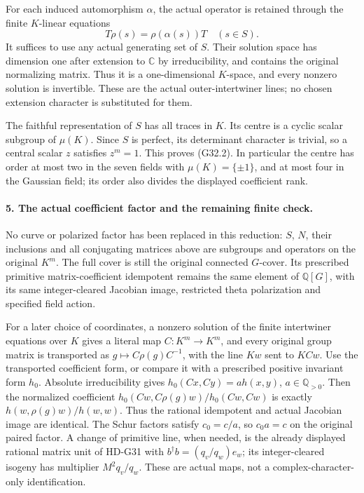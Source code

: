 For each induced automorphism \(\alpha\), the actual operator
is retained through the finite \(K\)-linear equations
\[
                 T\rho(s)=\rho(\alpha(s))T\quad(s\in S).
 \tag{G32.13}
\]
It suffices to use any actual generating set of \(S\). Their
solution space has dimension one after extension to \(\mathbb C\)
by irreducibility, and contains the original normalizing matrix.
Thus it is a one-dimensional \(K\)-space, and every nonzero
solution is invertible. These are the actual outer-intertwiner
lines; no chosen extension character is substituted for them.

The faithful representation of \(S\) has all traces in \(K\).
Its centre is a cyclic scalar subgroup of \(\mu(K)\). Since
\(S\) is perfect, its determinant character is trivial, so a
central scalar \(z\) satisfies \(z^m=1\). This proves (G32.2).
In particular the centre has order at most two in the seven
fields with \(\mu(K)=\{\pm1\}\), and at most four in the Gaussian
field; its order also divides the displayed coefficient rank.

\paragraph{5. The actual coefficient factor and the remaining finite check.}
No curve or polarized factor has been replaced in this reduction:
\(S\), \(N\), their inclusions and all conjugating matrices above
are subgroups and operators on the original \(K^m\). The full
cover is still the original connected \(G\)-cover. Its prescribed
primitive matrix-coefficient idempotent remains the same element
of \(\mathbb Q[G]\), with its same integer-cleared Jacobian image,
restricted theta polarization and specified field action.

For a later choice of coordinates, a nonzero solution of the
finite intertwiner equations over \(K\) gives a literal map
\(C:K^m\to K^m\), and every original group matrix is transported
as \(g\mapsto C\rho(g)C^{-1}\), with the line \(Kw\) sent to
\(KCw\). Use the transported coefficient form, or compare it
with a prescribed positive invariant form \(h_0\). Absolute
irreducibility gives
\(h_0(Cx,Cy)=a h(x,y)\), \(a\in\mathbb Q_{>0}\).
Then the normalized coefficient
\(h_0(Cw,C\rho(g)w)/h_0(Cw,Cw)\) is exactly
\(h(w,\rho(g)w)/h(w,w)\). Thus the rational idempotent and actual
Jacobian image are identical. The Schur factors satisfy
\(c_0=c/a\), so \(c_0a=c\) on the original paired factor.
A change of primitive line, when needed, is the already displayed
rational matrix unit of HD-G31 with
\(b^\dagger b=(q_v/q_w)e_w\); its integer-cleared isogeny has
multiplier \(M^2q_v/q_w\). These are actual maps, not a
complex-character-only identification.

